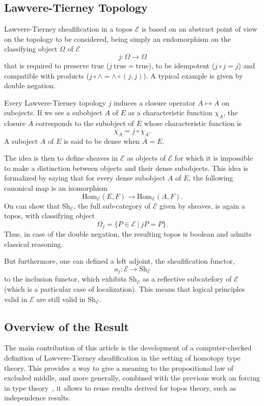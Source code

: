 \documentclass[conference]{IEEEtran}
\newcommand \True {\mathrm{true}}
\newcommand \closure[1] {\overline{#1}}
\newcommand \Char[1] {\chi_{#1}}%
\newcommand \E {\mathcal{E}}
\newcommand \Hom[1] {\mathrm{Hom}_{#1}}
\newcommand \Sh[1] {\mathrm{Sh}_{#1}}
\begin{document}
\subsection{Lawvere-Tierney Topology}

Lawvere-Tierney sheafification in a topos $\E$ is based on an abstract
point of view on the topology to be considered, being simply an
endomorphism on the classifying object $\Omega$ of $\E$  
%
$$
j : \Omega \rightarrow \Omega
$$
%
that is required to preserve $\True$ ($j \ \True = \True$), to be
idempotent ($j \circ j = j$) and compatible with products ($j \circ
\wedge = \wedge \circ (j, j)$).
%
A typical example is given by double negation.

Every Lawvere-Tierney topology $j$ induces a closure operator
$A \mapsto \closure{A}$ on subojects. If we see a subobject $A$ of $E$
as a characteristic function $\Char{A}$, the closure $\closure{A}$
corresponds to the subobject of $E$ whose characteristic function is 
%
$$
\Char{\closure{A}} = j \circ \Char{A}.
$$
%
A suboject $A$ of $E$ is said to
be dense when $\closure{A} = E$.

The idea is then to define sheaves in $\E$ as objects of $\E$ for
which it is impossible to make a distinction between objects and their
dense subobjects. This idea is formalized by saying that for every
dense subobject $A$ of $E$, the following canonical map is an
isomorphism
%
\begin{equation}\label{equ:sheaf_def}
\Hom{\E}(E,F) \rightarrow \Hom{\E}(A,F).
\end{equation}
%
On can show that $\Sh{\E}$, the full sub-category of $\E$ given by
sheaves, is again a topos, with classifying object
%
$$
\Omega_j = \{ P \in \E \ | \ j P  = P \}.
$$
%
Thus, in case of the double negation, the resulting topos is boolean  
and admits classical reasoning.

But furthermore, one can defined a left adjoint, the sheafification
functor, 
%
$$
a_j : \E \rightarrow \Sh{\E}
$$
to the inclusion functor, which exhibits $\Sh{\E}$ as a reflective
subcatefory of $\E$ (which is a particular case of localization). This
means that logical principles valid in $\E$ are still valid in
$\Sh{\E}$.


\subsection{Overview of the Result}

The main contribution of this article is the development of a
computer-checked definition of Lawvere-Tierney sheafification in the
setting of homotopy type theory.
%
This provides a way to give a meaning to the propositional law of
excluded middle, and more generally, combined with the previous work on
forcing in type theory~\cite{jaber2012extending}, it allows to reuse
results derived for topos theory, such as independence results.
\end{document}
